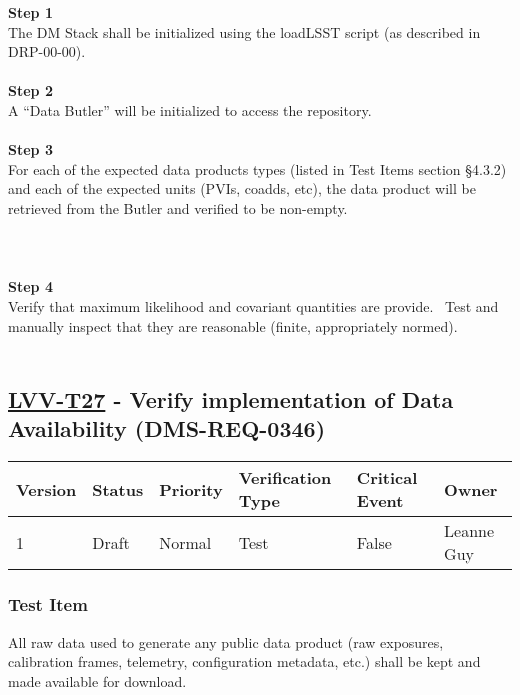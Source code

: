 \textbf{Step 1}\\
The DM Stack shall be initialized using the loadLSST script (as
described in DRP-00-00).\\
~\\
\textbf{Step 2}\\
A ``Data Butler'' will be initialized to access the repository.\\
~\\
\textbf{Step 3}\\
For each of the expected data products types (listed in Test Items
section §4.3.2) and each of the expected units (PVIs, coadds, etc), the
data product will be retrieved from the Butler and verified to be
non-empty.\\
~\\
~\\
~\\
\textbf{Step 4}\\
Verify that maximum likelihood and covariant quantities are provide.
~Test and manually inspect that they are reasonable (finite,
appropriately normed).\\
~\\

\hypertarget{lvv-t27---verify-implementation-of-data-availability-dms-req-0346}{%
\subsection{\texorpdfstring{\href{https://jira.lsstcorp.org/secure/Tests.jspa\#/testCase/LVV-T27}{LVV-T27}
- Verify implementation of Data Availability
(DMS-REQ-0346)}{LVV-T27 - Verify implementation of Data Availability (DMS-REQ-0346)}}\label{lvv-t27---verify-implementation-of-data-availability-dms-req-0346}}

\begin{longtable}[]{@{}llllll@{}}
\toprule
Version & Status & Priority & Verification Type & Critical Event &
Owner\tabularnewline
\midrule
\endhead
1 & Draft & Normal & Test & False & Leanne Guy\tabularnewline
\bottomrule
\end{longtable}

\hypertarget{test-item}{%
\subsubsection{Test Item}\label{test-item}}

All raw data used to generate any public data product (raw exposures,
calibration frames, telemetry, configuration metadata, etc.) shall be
kept and made available for download.

